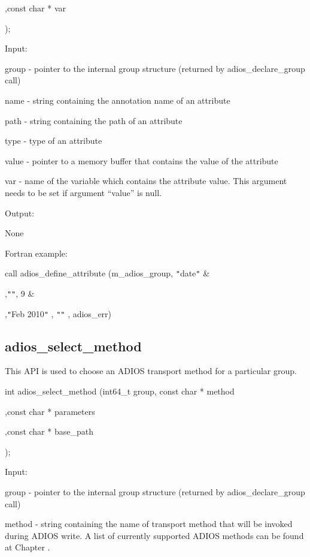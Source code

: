 ,const char * var

\parindent=374pt
);

\parindent=0pt
Input:

\leftskip=45pt
group - pointer to the internal group structure (returned by adios\_declare\_group 
call)

\leftskip=117pt
\parindent=-72pt
name - string containing the annotation name of an attribute

\leftskip=45pt
\parindent=0pt
path - string containing the path of an attribute

type  - type of an attribute

value - pointer to a memory buffer that contains the value of the attribute

var - name of the variable which contains the attribute value. This argument needs 
to be set if argument ``value'' is null.  

\parindent=-22pt
Output:

\parindent=-4pt
None

\leftskip=22pt
\parindent=0pt
Fortran example: 

\leftskip=0pt
\parindent=46pt
call adios\_define\_attribute (m\_adios\_group, \texttt{"}date\texttt{"} \&

\parindent=234pt
,\texttt{"}\texttt{"}, 9 \&

,\texttt{"}Feb 2010\texttt{"} , \texttt{"}\texttt{"} , adios\_err)\label{HToc182553361}

\subsection{adios\_select\_method}

\parindent=0pt
This API is used to choose an ADIOS transport method for a particular group. 

\leftskip=103pt
\parindent=-81pt
int adios\_select\_method (int64\_t group, const char * method

\parindent=91pt
,const char * parameters

,const char * base\_path

\parindent=264pt
);

\leftskip=22pt
\parindent=0pt
Input:

group - pointer to the internal group structure (returned by adios\_declare\_group 
call)

method - string containing the name of transport method that will be invoked during 
ADIOS write. A list of currently supported ADIOS methods can be found at Chapter 
.

